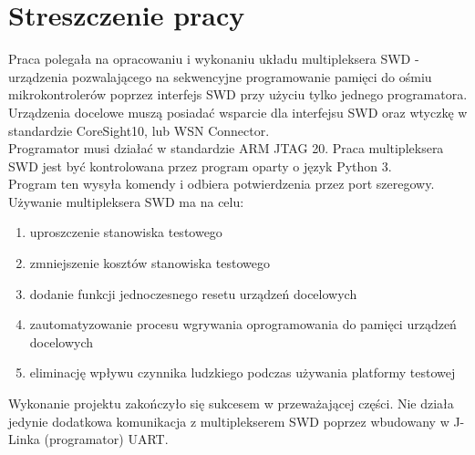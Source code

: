 \chapter{Streszczenie pracy}
Praca polegała na opracowaniu i wykonaniu układu multipleksera SWD - urządzenia pozwalającego na sekwencyjne programowanie pamięci  do ośmiu mikrokontrolerów poprzez interfejs SWD przy użyciu tylko jednego programatora.\\
Urządzenia docelowe muszą posiadać wsparcie dla interfejsu SWD oraz wtyczkę w standardzie CoreSight10, lub WSN Connector.\\
Programator musi działać w standardzie ARM JTAG 20.
Praca multipleksera SWD jest być kontrolowana przez program oparty o język Python 3.\\ 
Program ten wysyła komendy  i odbiera potwierdzenia przez port szeregowy.\\
Używanie multipleksera SWD ma na celu:
\begin{enumerate}
    \item uproszczenie stanowiska testowego
    \item zmniejszenie kosztów stanowiska testowego
    \item dodanie funkcji jednoczesnego resetu urządzeń docelowych
    \item zautomatyzowanie procesu wgrywania oprogramowania do pamięci urządzeń docelowych
    \item eliminację wpływu czynnika ludzkiego podczas używania platformy testowej
\end{enumerate}

Wykonanie projektu zakończyło się sukcesem w przeważającej części. Nie działa jedynie dodatkowa komunikacja z multiplekserem SWD poprzez wbudowany w J-Linka (programator) UART.
